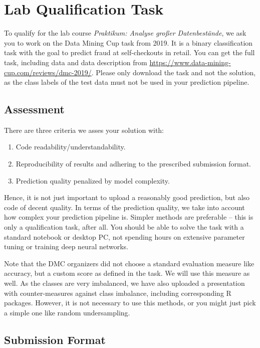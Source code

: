 \documentclass[headinclude,headsepline]{scrartcl}
\begin{document}
\section{Lab Qualification Task}

To qualify for the lab course \emph{Praktikum: Analyse großer Datenbestände}, we ask you to work on the Data Mining Cup task from 2019.
It is a binary classification task with the goal to predict fraud at self-checkouts in retail.
You can get the full task, including data and data description from \url{https://www.data-mining-cup.com/reviews/dmc-2019/}.
Please only download the task and not the solution, as the class labels of the test data must not be used in your prediction pipeline.

\subsection{Assessment}

There are three criteria we asses your solution with:

\begin{enumerate}
	\item Code readability/understandability.
	\item Reproducibility of results and adhering to the prescribed submission format.
	\item Prediction quality penalized by model complexity.
\end{enumerate}

Hence, it is not just important to upload a reasonably good prediction, but also code of decent quality.
In terms of the prediction quality, we take into account how complex your prediction pipeline is.
Simpler methods are preferable -- this is only a qualification task, after all.
You should be able to solve the task with a standard notebook or desktop PC, not spending hours on extensive parameter tuning or training deep neural networks.

Note that the DMC organizers did not choose a standard evaluation measure like accuracy, but a custom score as defined in the task.
We will use this measure as well.
As the classes are very imbalanced, we have also uploaded a presentation with counter-measures against class imbalance, including corresponding R packages.
However, it is not necessary to use this methods, or you might just pick a simple one like random undersampling.

\subsection{Submission Format}
\end{document}
